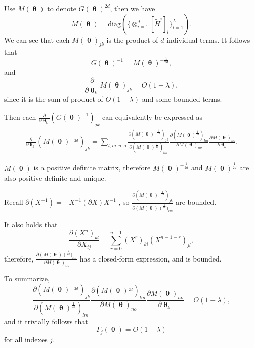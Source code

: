 \documentclass[10pt]{article} %
\DeclareMathOperator{\btheta}{\boldsymbol{\theta}}
\theoremstyle{plain}
\theoremstyle{definition}
\theoremstyle{remark}
\begin{document}
Use $M(\btheta)$ to denote $G(\btheta)^{2d}$, then we have
\begin{equation*}
M(\btheta) = \text{diag}(\{\otimes_{i=1}^{d} [\tilde{H}^{i}]_{l}\}_{l=1}^{L}).
\end{equation*}
We can see that each $M(\btheta)_{jk}$ is the product of $d$ individual terms. It follows that
\begin{equation*}
G(\btheta)^{-1} = M(\btheta)^{-\frac{1}{2d}},
\end{equation*}
and
\begin{equation*}
\frac{\partial}{\partial\btheta_{k}}M(\btheta)_{jk} = O(1-\lambda),
\end{equation*}
since it is the sum of product of $O(1-\lambda)$ and some bounded terms.

Then each $\frac{\partial}{\partial\btheta_k}(G(\btheta)^{-1})_{jk}$ can equivalently be expressed as
\begin{align*}
\frac{\partial}{\partial\btheta_k}(M(\btheta)^{-\frac{1}{2d}})_{jk} = \sum_{l, m, n, o}\frac{\partial (M(\btheta)^{-\frac{1}{2d}})_{jk}}{\partial (M(\btheta)^{\frac{1}{2d}})_{lm}}\frac{\partial (M(\btheta)^{\frac{1}{2d}})_{lm}}{\partial M(\btheta)_{no}}\frac{\partial M(\btheta)_{no}}{\partial\btheta_k}.
\end{align*}

$M(\btheta)$ is a positive definite matrix, therefore $M(\btheta)^{-\frac{1}{2d}}$ and $M(\btheta)^{\frac{1}{2d}}$ are also positive definite and unique.

Recall $\partial(X^{-1}) = -X^{-1}(\partial X)X^{-1}$ \citep{Petersen2012}, so $\frac{\partial (M(\btheta)^{-\frac{1}{2d}})_{jk}}{\partial (M(\btheta))^{\frac{1}{2d}})_{lm}}$ are bounded.

It also holds that \citep{Petersen2012}
\begin{equation*}
    \frac{\partial (X^{n})_{kl}}{\partial X_{ij}} = \sum_{r=0}^{n-1}(X^{r})_{ki}(X^{n-1-r})_{jl},
\end{equation*}
therefore, $\frac{\partial (M(\btheta))^{\frac{1}{2d}})_{lm}}{\partial M(\btheta)_{no}}$ has a closed-form expression, and is bounded.

To summarize, 
\begin{equation*}
\frac{\partial (M(\btheta)^{-\frac{1}{2d}})_{jk}}{\partial (M(\btheta)^{\frac{1}{2d}})_{lm}}\frac{\partial (M(\btheta)^{\frac{1}{2d}})_{lm}}{\partial M(\btheta)_{no}}\frac{\partial M(\btheta)_{no}}{\partial\btheta_k} = O(1-\lambda),
\end{equation*}
and it trivially follows that
\begin{equation*}
\Gamma_{j}(\btheta) = O(1-\lambda)
\end{equation*}
for all indexes $j$.
\end{document}
